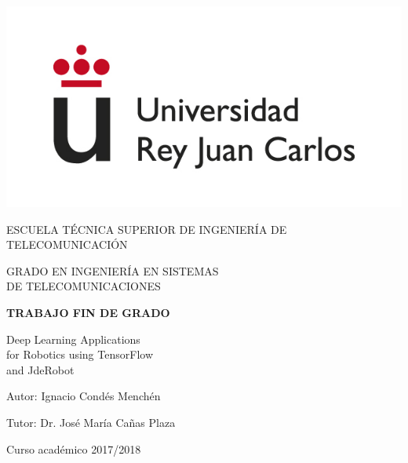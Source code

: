 \begin{titlepage}
	\begin{center}
		\vspace*{7.7mm}
		\includegraphics[width=0.4\linewidth]{images/logo}
		\vspace{6.5mm}
		
		\fontsize{15.5}{14}\selectfont ESCUELA TÉCNICA SUPERIOR DE INGENIERÍA DE TELECOMUNICACIÓN
		\vspace{13mm}
		
		\fontsize{14}{14}\selectfont GRADO EN INGENIERÍA EN SISTEMAS \\ DE TELECOMUNICACIONES
		
		\vspace{70pt}
		
		\fontsize{15.7}{14}\selectfont \textbf{TRABAJO FIN DE GRADO}
		
		\vspace{25mm}
		\begin{huge}
			Deep Learning Applications\\ for Robotics using TensorFlow \\
			and JdeRobot\\
		\end{huge}
		
		\vspace{25mm}
		
		\begin{large}
			Autor: Ignacio Condés Menchén

			Tutor: Dr. José María Cañas Plaza
		\end{large}
		\begin{normalsize}
			
			Curso académico 2017/2018
		\end{normalsize}
		\vspace{10mm}
	\end{center}
\end{titlepage}

\pagebreak
\thispagestyle{empty}
\vspace*{18cm}

